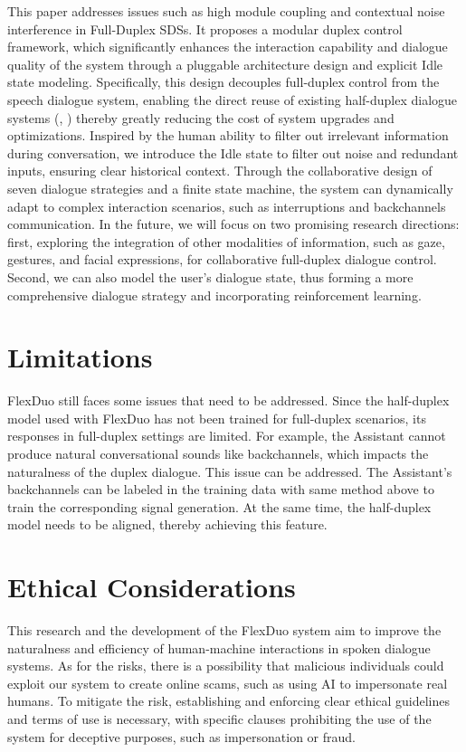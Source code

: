 \documentclass[11pt]{article}
\begin{document}
This paper addresses issues such as high module coupling and contextual noise interference in Full-Duplex SDSs. It proposes a modular duplex control framework, which significantly enhances the interaction capability and dialogue quality of the system through a pluggable architecture design and explicit Idle state modeling. Specifically, this design decouples full-duplex control from the speech dialogue system, enabling the direct reuse of existing half-duplex dialogue systems (\citealp{zeng2024glm4voiceintelligenthumanlikeendtoend}, \citealp{yao2024minicpmvgpt4vlevelmllm}) thereby greatly reducing the cost of system upgrades and optimizations. Inspired by the human ability to filter out irrelevant information during conversation, we introduce the Idle state to filter out noise and redundant inputs, ensuring clear historical context. Through the collaborative design of seven dialogue strategies and a finite state machine, the system can dynamically adapt to complex interaction scenarios, such as interruptions and backchannels communication. In the future, we will focus on two promising research directions: first, exploring the integration of other modalities of information, such as gaze, gestures, and facial expressions, for collaborative full-duplex dialogue control. Second, we can also model the user's dialogue state, thus forming a more comprehensive dialogue strategy and incorporating reinforcement learning.


\section*{Limitations}
FlexDuo still faces some issues that need to be addressed. Since the half-duplex model used with FlexDuo has not been trained for full-duplex scenarios, its responses in full-duplex settings are limited. For example, the Assistant cannot produce natural conversational sounds like backchannels, which impacts the naturalness of the duplex dialogue. This issue can be addressed.  The Assistant's backchannels can be labeled in the training data with same method above to train the corresponding signal generation. At the same time, the half-duplex model needs to be aligned, thereby achieving this feature.

\section*{Ethical Considerations}
This research and the development of the FlexDuo system aim to improve the naturalness and efficiency of human-machine interactions in spoken dialogue systems. As for the risks, there is a possibility that malicious individuals could exploit our system to create online scams, such as using AI to impersonate real humans. To mitigate the risk, establishing and enforcing clear ethical guidelines and terms of use is necessary, with specific clauses prohibiting the use of the system for deceptive purposes, such as impersonation or fraud.
\end{document}
